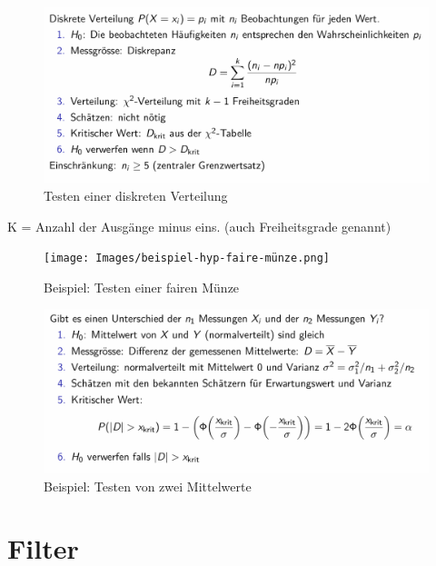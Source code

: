 \documentclass[../Main.tex]{subfiles}
\begin{document}
\begin{figure}[H]
    \centering
    \includegraphics[width=1\linewidth]{Images/test-diskrete-verteilung.png}
    \caption{Testen einer diskreten Verteilung}
\end{figure}
K = Anzahl der Ausgänge minus eins. (auch Freiheitsgrade genannt)

\begin{figure}[H]
    \centering
    \texttt{[image: Images/beispiel-hyp-faire-münze.png]}
    \caption{Beispiel: Testen einer fairen Münze}
\end{figure}

\begin{figure}[H]
    \centering
    \includegraphics[width=1\linewidth]{Images/beispiel-hyp-mittelwert.png}
    \caption{Beispiel: Testen von zwei Mittelwerte}
\end{figure}

\section{Filter}
\end{document}
